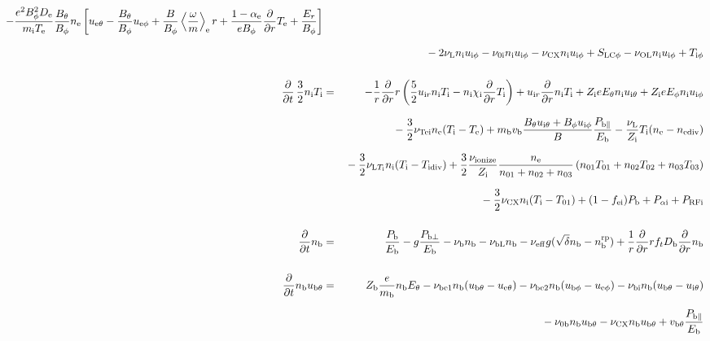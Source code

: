 \documentclass[11pt]{article}
\def\r#1{{\rm#1}}
\def\ddt{\frac{\partial}{\partial t}}
\def\ddr{\frac{\partial}{\partial r}}
\def\ave#1{\left\langle#1\right\rangle}
\def\mi{m_\r{i}}
\def\mb{m_\r{b}}
\def\De{D_\r{e}}
\def\Di{D_\r{i}}
\def\chii{\chi_\r{i}}
\def\nee{n_\r{e}}
\def\ni{n_\r{i}}
\def\nb{n_\r{b}}
\def\uir{u_{\r{i}r}}
\def\ueth{u_{\r{e}\theta}}
\def\uith{u_{\r{i}\theta}}
\def\ubth{u_{\r{b}\theta}}
\def\ueph{u_{\r{e}\phi}}
\def\uiph{u_{\r{i}\phi}}
\def\ubph{u_{\r{b}\phi}}
\def\Er{E_r}
\def\Eth{E_\theta}
\def\Eph{E_\phi}
\def\Bth{B_\theta}
\def\Bph{B_\phi}
\def\Te{T_\r{e}}
\def\Ti{T_\r{i}}
\def\nna{n_{01}}
\def\nnb{n_{02}}
\def\nnc{n_{03}}
\def\Zi{Z_\r{i}}
\def\Zb{Z_\r{b}}
\def\Pb{P_\r{b}}
\def\Eb{E_\r{b}}
\def\PRFi{P_\r{RFi}}
\def\Tna{T_{01}}
\def\Tnb{T_{02}}
\def\Tnc{T_{03}}
\def\fei{f_\r{ei}}
\def\nbrp{n_\r{b}^\r{rp}}
\def\Pbpara{P_{\r{b}\parallel}}
\def\Pbperp{P_{\r{b}\perp}}
\def\nueff{\nu_\r{eff}}
\def\Db{D_\r{b}}
\def\Palpi{P_{\alpha\r{i}}}
\def\nuNCi{\nu_\r{NCi}}
\def\nubi{\nu_\r{bi}}
\def\nuni{\nu_\r{0i}}
\def\nunb{\nu_\r{0b}}
\def\nuL{\nu_\r{L}}
\def\nuCX{\nu_\r{CX}}
\def\nuion{\nu_\r{ionize}}
\def\nub{\nu_\r{b}}
\def\nuTei{\nu_\r{Tei}}
\def\vb{v_\r{b}}
\def\nediv{n_\r{ediv}}
\def\Tidiv{T_\r{idiv}}
\def\nuLTi{\nu_{\r{L}T_\r{i}}}
\def\nuOL{\nu_\r{OL}}
\def\nubL{\nu_\r{bL}}
\def\vbth{v_{\r{b}\theta}}
\begin{document}
\begin{eqnarray}
%
%
  - \frac{e^2 \Bph^2 \De}{\mi\Te}\frac{\Bth}{\Bph}\nee
    \left[\ueth - \frac{\Bth}{\Bph}\ueph
     + \frac{B}{\Bph}\ave{\frac{\omega}{m}}_\r{e} r
     + \frac{1-\alpha_\r{e}}{e\Bph}\ddr \Te + \frac{\Er}{\Bph}\right]
%
\nonumber\\[2.5mm]&&{}
%
  - 2 \nuL \ni \uiph
%
  - \nuni \ni \uiph
%
  - \nuCX \ni \uiph
%
  + S_\r{LC\phi}
%
  - \nuOL \ni \uiph
%
  + T_{\r{i}\phi}
%
%
\\[5mm]
  \ddt \, \frac{3}{2} \ni \Ti &=&
%
 - \frac{1}{r} \ddr r
   \left( \frac{5}{2} \uir \ni \Ti - \ni \chii \ddr \Ti \right)
%
  + \uir \ddr \ni \Ti
%
  + \Zi e \Eth \ni \uith
%
  + \Zi e \Eph \ni \uiph
\nonumber\\[2.5mm]&&{}
%
  - \frac{3}{2} \nuTei \nee (\Ti - \Te)
%
  + \mb \vb \frac{\Bth \uith + \Bph \uiph}{B} \frac{\Pbpara}{\Eb}
%
  - \frac{\nuL}{\Zi} \Ti (\nee - \nediv)
\nonumber\\[2.5mm]&&{}
%
  - \frac{3}{2} \nuLTi \ni (\Ti - \Tidiv)
%
  + \frac{3}{2} \frac{\nuion}{\Zi} \frac{\nee}{\nna + \nnb + \nnc}\, (\nna \Tna +
  \nnb \Tnb + \nnc \Tnc)
\nonumber\\[2.5mm]&&{}
%
  - \frac{3}{2} \nuCX \ni (\Ti - \Tna)
%
  + (1 - \fei) \Pb
%
  + \Palpi
%
  + \PRFi
\\[5mm]
  \ddt \nb &=&
%
    \frac{\Pb}{\Eb}
%
  - g \frac{\Pbperp}{\Eb}
%
  - \nub \nb
%
  - \nubL \nb
%
  - \nueff g (\sqrt{\delta} \nb - \nbrp)
%
  + \frac{1}{r} \ddr r f_t \Db \ddr \nb
\\[5mm]
  \ddt \nb \ubth &=&
%
    \Zb \frac{e}{\mb} \nb \Eth
%
%
  - \nu_\r{be1} \nb (\ubth - \ueth)
%
  - \nu_\r{be2} \nb (\ubph - \ueph)
%
  - \nubi \nb (\ubth - \uith)
\nonumber\\[2.5mm]&&{}
%
  - \nunb \nb \ubth
%
  - \nuCX \nb \ubth
%
  + \vbth \frac{\Pbpara}{\Eb}

\end{eqnarray}
\end{document}

